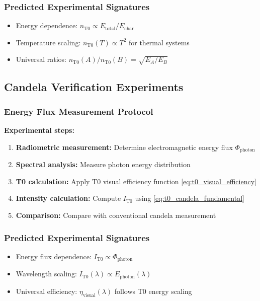 \documentclass[12pt,a4paper]{article}
\newcommand{\Echar}{E_{\text{char}}}
\newcommand{\etavis}{\eta_{\text{visual}}}
\newcommand{\Phiphoton}{\Phi_{\text{photon}}}
\begin{document}
\subsubsection{Predicted Experimental Signatures}
\label{subsubsec:mol_experimental_signatures}

\begin{itemize}
	\item Energy dependence: $n_{\text{T0}} \propto E_{\text{total}}/\Echar$
	\item Temperature scaling: $n_{\text{T0}}(T) \propto T^2$ for thermal systems
	\item Universal ratios: $n_{\text{T0}}(A)/n_{\text{T0}}(B) = \sqrt{E_A/E_B}$
\end{itemize}

\subsection{Candela Verification Experiments}
\label{subsec:candela_verification}

\subsubsection{Energy Flux Measurement Protocol}
\label{subsubsec:candela_energy_protocol}

\textbf{Experimental steps:}
\begin{enumerate}
	\item \textbf{Radiometric measurement:} Determine electromagnetic energy flux $\Phiphoton$
	\item \textbf{Spectral analysis:} Measure photon energy distribution
	\item \textbf{T0 calculation:} Apply T0 visual efficiency function \cref{eq:t0_visual_efficiency}
	\item \textbf{Intensity calculation:} Compute $I_{\text{T0}}$ using \cref{eq:t0_candela_fundamental}
	\item \textbf{Comparison:} Compare with conventional candela measurement
\end{enumerate}

\subsubsection{Predicted Experimental Signatures}
\label{subsubsec:candela_experimental_signatures}

\begin{itemize}
	\item Energy flux dependence: $I_{\text{T0}} \propto \Phiphoton$
	\item Wavelength scaling: $I_{\text{T0}}(\lambda) \propto E_{\text{photon}}(\lambda)$
	\item Universal efficiency: $\etavis(\lambda)$ follows T0 energy scaling
\end{itemize}
\end{document}
